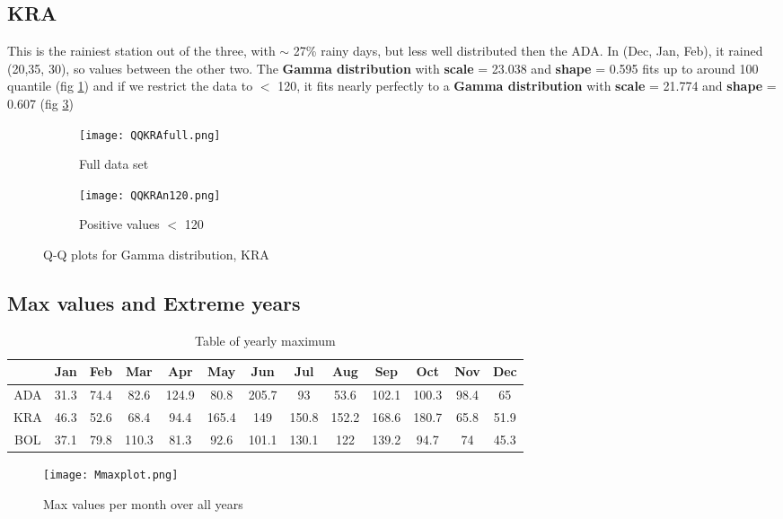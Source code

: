 \documentclass{article}
\begin{document}
	\subsection{KRA}
	This is the rainiest station out of the three, with $\sim$ 27\% rainy days, but less well distributed then the ADA. In (Dec, Jan, Feb), it rained (20,35, 30), so values between the other two. The \textbf{Gamma distribution} with \textbf{scale} = 23.038 and \textbf{shape} = 0.595 fits up to around 100 quantile (fig \ref{GammaKRA}) and if we restrict the data to $<$ 120, it fits nearly perfectly to a \textbf{Gamma distribution} with \textbf{scale} = 21.774 and \textbf{shape} = 0.607 (fig \ref{GammaKRAn120})
	\begin{figure}[H]
		\centering
		\begin{subfigure}{0.5\textwidth}
			\centering
			\texttt{[image: QQKRAfull.png]}
			\caption{Full data set}
			\label{GammaKRA}
		\end{subfigure}%
		\begin{subfigure}{0.5\textwidth}
			\centering
			\texttt{[image: QQKRAn120.png]}
			\caption{Positive values $<$ 120}
			\label{GammaKRAn120}
		\end{subfigure}
		\caption{Q-Q plots for Gamma distribution, KRA}
	\end{figure}
 	\subsection{Max values and Extreme years}
 	\begin{table}[H]
 		\centering
 		\begin{tabular}{|c| c c c c c c c c c c c c|} 
 			\hline
 			 & Jan & Feb & Mar & Apr & May & Jun & Jul & Aug & Sep & Oct & Nov & Dec \\ 
 			\hline\hline
 			ADA & 31.3 & 74.4 & 82.6 & 124.9 & 80.8 &  205.7 & 93 & 53.6& 102.1 & 100.3 & 98.4 & 65 \\ 
 			\hline
 			KRA & 46.3 & 52.6 & 68.4 & 94.4 & 165.4 & 149 & 150.8 & 152.2 & 168.6 & 180.7 & 65.8 & 51.9 \\
 			\hline
 			BOL & 37.1 & 79.8 & 110.3 & 81.3 & 92.6 & 101.1 & 130.1 & 122 & 139.2 & 94.7 & 74 & 45.3 \\
 			\hline
 		\end{tabular}
 		\caption{Table of yearly maximum}
 		\label{tableymax}
 	\end{table}	
 	
 	\begin{figure}[H]
 		\centering
 		\texttt{[image: Mmaxplot.png]}
 		\caption{Max values per month over all years}
 		\label{Mmax}
 	\end{figure}
\end{document}
